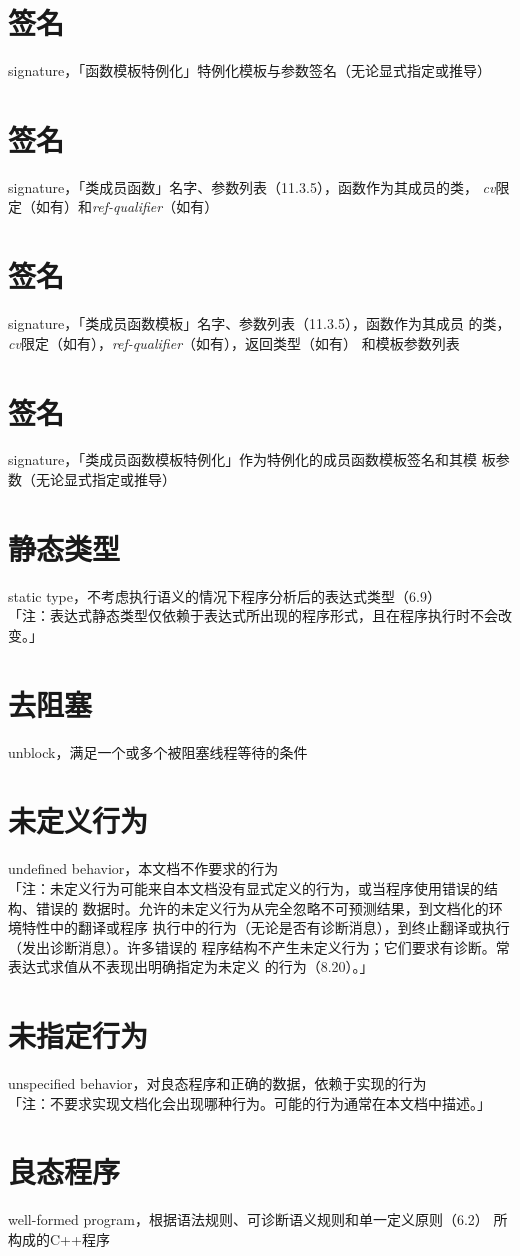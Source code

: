 \section{签名}
\noindent signature，「函数模板特例化」特例化模板与参数签名（无论显式指定或推导）

\section{签名}
\noindent signature，「类成员函数」名字、参数列表（11.3.5），函数作为其成员的类，
\textit{cv}限定（如有）和\textit{ref-qualifier}（如有）

\section{签名}
\noindent signature，「类成员函数模板」名字、参数列表（11.3.5），函数作为其成员
的类，\textit{cv}限定（如有），\textit{ref-qualifier}（如有），返回类型（如有）
和模板参数列表

\section{签名}
\noindent signature，「类成员函数模板特例化」作为特例化的成员函数模板签名和其模
板参数（无论显式指定或推导）

\section{静态类型}
\noindent static type，不考虑执行语义的情况下程序分析后的表达式类型（6.9） \\
「注：表达式静态类型仅依赖于表达式所出现的程序形式，且在程序执行时不会改变。」

\section{去阻塞}
\noindent unblock，满足一个或多个被阻塞线程等待的条件

\section{未定义行为}
\noindent undefined behavior，本文档不作要求的行为 \\
「注：未定义行为可能来自本文档没有显式定义的行为，或当程序使用错误的结构、错误的
数据时。允许的未定义行为从完全忽略不可预测结果，到文档化的环境特性中的翻译或程序
执行中的行为（无论是否有诊断消息），到终止翻译或执行（发出诊断消息）。许多错误的
程序结构不产生未定义行为；它们要求有诊断。常表达式求值从不表现出明确指定为未定义
的行为（8.20）。」

\section{未指定行为}
\noindent unspecified behavior，对良态程序和正确的数据，依赖于实现的行为 \\
「注：不要求实现文档化会出现哪种行为。可能的行为通常在本文档中描述。」

\section{良态程序}
\noindent well-formed program，根据语法规则、可诊断语义规则和单一定义原则（6.2）
所构成的C++程序

